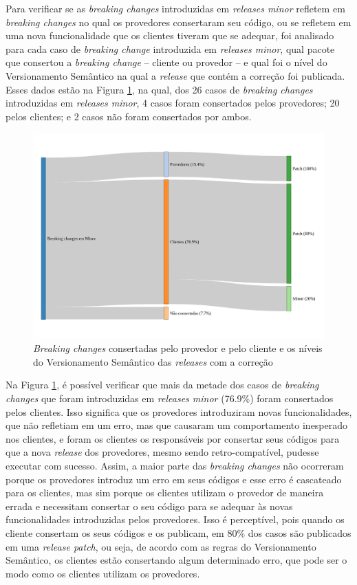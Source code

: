 Para verificar se as \textit{breaking changes} introduzidas em \textit{releases minor} refletem em \textit{breaking changes} no qual os provedores consertaram seu código, ou se refletem em uma nova funcionalidade que os clientes tiveram que se adequar, foi analisado para cada caso de \textit{breaking change} introduzida em \textit{releases minor}, qual pacote que consertou a \textit{breaking change} -- cliente ou provedor -- e qual foi o nível do Versionamento Semântico na qual a \textit{release} que contém a correção foi publicada. Esses dados estão na Figura \ref{fig:semver_fixed}, na qual, dos 26 casos de \textit{breaking changes} introduzidas em \textit{releases minor}, 4 casos foram consertados pelos provedores; 20 pelos clientes; e 2 casos não foram consertados por ambos.

\begin{figure}
    \centering
    \includegraphics[scale=0.5]{figuras/semver_fixed.pdf}
    \caption{\textit{Breaking changes} consertadas pelo provedor e pelo cliente e os níveis do Versionamento Semântico das \textit{releases} com a correção}
    \label{fig:semver_fixed}
\end{figure}{}

Na Figura \ref{fig:semver_fixed}, é possível verificar que mais da metade dos casos de \textit{breaking changes} que foram introduzidas em \textit{releases minor} (76.9\%) foram consertados pelos clientes. Isso significa que os provedores introduziram novas funcionalidades, que não refletiam em um erro, mas que causaram um comportamento inesperado nos clientes, e foram os clientes os responsáveis por consertar seus códigos para que a nova \textit{release} dos provedores, mesmo sendo retro-compatível, pudesse executar com sucesso. Assim, a maior parte das \textit{breaking changes} não ocorreram porque os provedores introduz um erro em seus códigos e esse erro é cascateado para os clientes, mas sim porque os clientes utilizam o provedor de maneira errada e necessitam consertar o seu código para se adequar às novas funcionalidades introduzidas pelos provedores. Isso é perceptível, pois quando os cliente consertam os seus códigos e os publicam, em 80\% dos casos são publicados em uma \textit{release patch}, ou seja, de acordo com as regras do Versionamento Semântico, os clientes estão consertando algum determinado erro, que pode ser o modo como os clientes utilizam os provedores.

